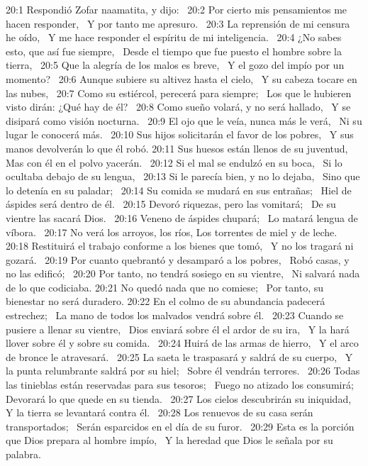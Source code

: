 20:1 Respondió Zofar naamatita, y dijo:  
20:2 Por cierto mis pensamientos me hacen responder,  
Y por tanto me apresuro.  
20:3 La reprensión de mi censura he oído,  
Y me hace responder el espíritu de mi inteligencia.  
20:4 ¿No sabes esto, que así fue siempre,  
Desde el tiempo que fue puesto el hombre sobre la tierra,  
20:5 Que la alegría de los malos es breve,  
Y el gozo del impío por un momento?  
20:6 Aunque subiere su altivez hasta el cielo,  
Y su cabeza tocare en las nubes,  
20:7 Como su estiércol, perecerá para siempre;  
Los que le hubieren visto dirán: ¿Qué hay de él?  
20:8 Como sueño volará, y no será hallado,  
Y se disipará como visión nocturna.  
20:9 El ojo que le veía, nunca más le verá,  
Ni su lugar le conocerá más.  
20:10 Sus hijos solicitarán el favor de los pobres,  
Y sus manos devolverán lo que él robó. 
20:11 Sus huesos están llenos de su juventud,  
Mas con él en el polvo yacerán.  
20:12 Si el mal se endulzó en su boca,  
Si lo ocultaba debajo de su lengua,  
20:13 Si le parecía bien, y no lo dejaba,  
Sino que lo detenía en su paladar;  
20:14 Su comida se mudará en sus entrañas;  
Hiel de áspides será dentro de él.  
20:15 Devoró riquezas, pero las vomitará;  
De su vientre las sacará Dios.  
20:16 Veneno de áspides chupará;  
Lo matará lengua de víbora.  
20:17 No verá los arroyos, los ríos, 
Los torrentes de miel y de leche.  
20:18 Restituirá el trabajo conforme a los bienes que tomó,  
Y no los tragará ni gozará.  
20:19 Por cuanto quebrantó y desamparó a los pobres,  
Robó casas, y no las edificó;  
20:20 Por tanto, no tendrá sosiego en su vientre,  
Ni salvará nada de lo que codiciaba. 
20:21 No quedó nada que no comiese;  
Por tanto, su bienestar no será duradero. 
20:22 En el colmo de su abundancia padecerá estrechez;  
La mano de todos los malvados vendrá sobre él.  
20:23 Cuando se pusiere a llenar su vientre,  
Dios enviará sobre él el ardor de su ira,  
Y la hará llover sobre él y sobre su comida.  
20:24 Huirá de las armas de hierro,  
Y el arco de bronce le atravesará.  
20:25 La saeta le traspasará y saldrá de su cuerpo,  
Y la punta relumbrante saldrá por su hiel;  
Sobre él vendrán terrores.  
20:26 Todas las tinieblas están reservadas para sus tesoros;  
Fuego no atizado los consumirá;  
Devorará lo que quede en su tienda.  
20:27 Los cielos descubrirán su iniquidad,  
Y la tierra se levantará contra él.  
20:28 Los renuevos de su casa serán transportados;  
Serán esparcidos en el día de su furor.  
20:29 Esta es la porción que Dios prepara al hombre impío,  
Y la heredad que Dios le señala por su palabra.  
